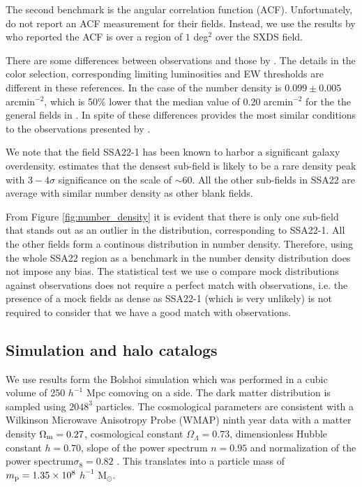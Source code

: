 \documentclass{emulateapj}
\newcommand{\hMpc}{{\ifmmode{h^{-1}{\rm Mpc}}\else{$h^{-1}$Mpc }\fi}}
\begin{document}
The second benchmark is the angular correlation function
(ACF). Unfortunately, \cite{Yamada2012} do  not report an ACF measurement for
their fields. Instead, we use the results by   \cite{Ouchi2008} who
reported the ACF is over a region of $1$ deg$^2$ over the SXDS
field.  

There are some differences between \cite{Ouchi2008} observations
and those by \cite{Yamada2012}. The details in the color selection,
corresponding limiting luminosities and EW thresholds are different
in these references. In the case of
\cite{Ouchi2008} the number density is $0.099\pm0.005$ arcmin$^{-2}$, which
is 50\% lower that the median value of $0.20$ arcmin$^{-2}$ for the
the general fields in \cite{Yamada2012}. In spite of these
differences \cite{Ouchi2008} provides the most similar conditions
to the observations presented by \cite{Yamada2012}.


We note that the field SSA22-1 has been known to harbor a significant
galaxy overdensity. \cite{Yamada2012} estimates that the densest
sub-field is likely to be a rare density peak with $3-4\sigma$
significance on the scale of $\sim 60$\hMpc.  All the other sub-fields
in SSA22 are average with similar number density as other blank fields. 

From Figure \ref{fig:number_density}  it is evident that there is only
one sub-field  that stands out as an outlier in the distribution,
corresponding to SSA22-1. All the other fields form a continous
distribution in number density. Therefore, using the whole SSA22
region as a benchmark in the number density distribution does not
impose any bias. The statistical test we use o compare mock
distributions against observations does not require a perfect match
with observations, i.e. the presence of a mock fields as dense as
SSA22-1 (which is very unlikely) is not required to consider that we
have a good match with observations.

\subsection{Simulation and halo catalogs}

We use results form the Bolshoi simulation \citep{Bolshoi} which
was performed in a cubic volume of 250 $h^{-1}$ Mpc comoving on a side. The
dark matter distribution is sampled using $2048^{3}$ particles. The
cosmological parameters are consistent with a Wilkinson Microwave
Anisotropy Probe (WMAP) ninth year data with a matter density
$\Omega_{\rm m} = 0.27$, cosmological constant
$\Omega_{\Lambda}=0.73$, dimensionless Hubble constant $h=0.70$, slope
of the power spectrum $n=0.95$ and normalization of the power
spectrum$\sigma_{8}=0.82$ \citep{hinshaw_etal13}.   This
translates into a particle mass of $m_{\rm p}=1.35\times 10^{8}$
$h^{-1}$ M$_{\odot}$.  
\end{document}
